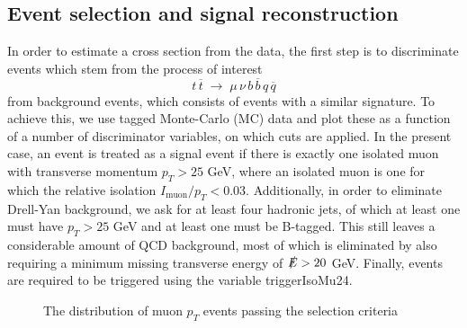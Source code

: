 \documentclass[11pt,a4paper]{article}
\begin{document}
\subsection{Event selection and signal reconstruction}
In order to estimate a cross section from the data, the first step is to discriminate events which stem from the process of interest
\begin{equation}
	t \, \overline{t} \; \rightarrow \; \mu \, \nu \, b \, \overline{b} \, q \, \overline{q} 
\end{equation}
from background events, which consists of events with a similar signature. To achieve this, we use tagged Monte-Carlo (MC) data and plot these as a function of a number of discriminator variables, on which cuts are applied. In the present case, an event is treated as a signal event if there is exactly one isolated muon with transverse momentum $p_T > 25$ GeV, where an isolated muon is one for which the relative isolation $I_\text{muon} / p_T < 0.03$. Additionally, in order to eliminate Drell-Yan background, we ask for at least four hadronic jets, of which at least one must have $p_T > 25$ GeV and at least one must be B-tagged. This still leaves a considerable amount of QCD background, most of which is eliminated by also requiring a minimum missing transverse energy of $\slashed{E} > 20$ GeV. Finally, events are required to be triggered using the variable triggerIsoMu24. 
\begin{figure}[!htb]
	\begin{center}
	\end{center}
	\caption{The distribution of muon $p_T$ events passing the selection criteria}
	\label{fig:bgsubtraction}
\end{figure}
\end{document}
